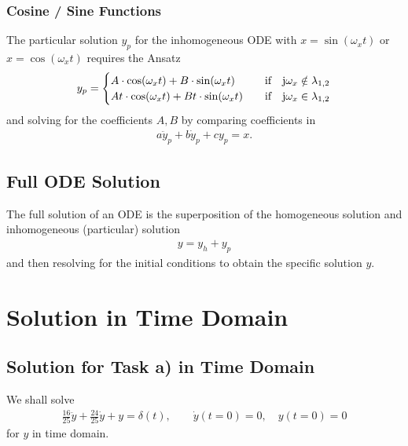 \documentclass[a4paper,11pt,oneside]{scrartcl}
\begin{document}
\subsubsection{Cosine / Sine Functions}
\label{Sec:CosSineAnsatzInhomo}
The particular solution $y_p$ for the inhomogeneous ODE with
$x=\sin(\omega_x t)$ or $x=\cos(\omega_x t)$
requires the Ansatz
\begin{align}
y_p =
\begin{cases}
A \cdot \cos(\omega_x t) + B \cdot \sin(\omega_x t)&\quad \text{if}
\quad \im \omega_x \notin \lambda_{1,2}\\
A t \cdot \cos(\omega_x t) + B t \cdot \sin(\omega_x t)&\quad \text{if}
\quad \im \omega_x \in \lambda_{1,2}
\end{cases}
\end{align}
and solving for the coefficients $A, B$ by comparing coefficients
in
\begin{align}
a \ddot{y}_p + b \dot{y}_p + c y_p = x.
\end{align}

\subsection{Full ODE Solution}
The full solution of an ODE is the superposition of the homogeneous solution
and inhomogeneous (particular) solution
\begin{align}
y = y_h + y_p
\end{align}
and then resolving for the initial conditions to obtain the specific solution
$y$.


\section{Solution in Time Domain}

\subsection{Solution for Task a) in Time Domain}
We shall solve
\begin{align}
\frac{16}{25} \ddot{y} + \frac{24}{25} \dot{y} + y = \delta(t), \qquad
\dot{y}(t=0) = 0,\quad y(t=0)=0
\end{align}
for $y$ in time domain.
\end{document}
